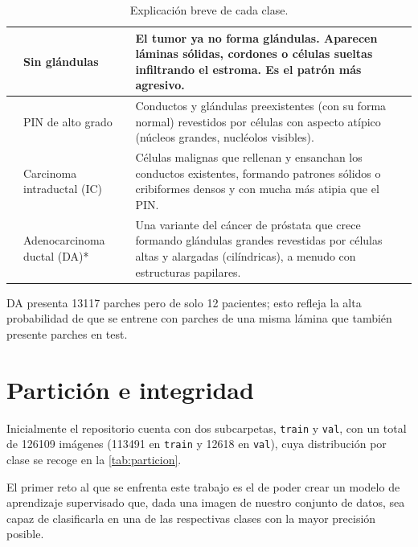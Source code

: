 \begin{table}[htbp]
\begin{tabularx}{\textwidth}{>{\raggedright\arraybackslash}p{2.6cm} >{\raggedright\arraybackslash}p{3.4cm} >{\raggedright\arraybackslash}X}
 & Sin glándulas & El tumor ya no forma glándulas. Aparecen láminas sólidas, cordones o células sueltas infiltrando el estroma. Es el patrón más agresivo. \\
\midrule
\multirow{3}{=}{Lesiones que no se gradúan con Gleason}
 & PIN de alto grado & Conductos y glándulas preexistentes (con su forma normal) revestidos por células con aspecto atípico (núcleos grandes, nucléolos visibles). \\
 & Carcinoma intraductal (IC) & Células malignas que rellenan y ensanchan los conductos existentes, formando patrones sólidos o cribiformes densos y con mucha más atipia que el PIN. \\
 & Adenocarcinoma ductal (DA)* & Una variante del cáncer de próstata que crece formando glándulas grandes revestidas por células altas y alargadas (cilíndricas), a menudo con estructuras papilares. \\
\bottomrule
\end{tabularx}
\caption{Explicación breve de cada clase.}
\label{tab:clases}
\vspace{2pt}
\begin{minipage}{\textwidth}
\footnotesize * DA presenta 13117 parches pero de solo 12 pacientes; esto refleja la alta probabilidad de que se entrene con parches de una misma lámina que también presente parches en test.
\end{minipage}
\end{table}


\section{Partición e integridad}\label{sec:particion}

Inicialmente el repositorio cuenta con dos subcarpetas, \texttt{train} y \texttt{val}, con un total de \num{126109} imágenes (\num{113491} en \texttt{train} y \num{12618} en \texttt{val}), cuya distribución por clase se recoge en la \cref{tab:particion}.



El primer reto al que se enfrenta este trabajo es el de poder crear un modelo de aprendizaje supervisado que, dada una imagen de nuestro conjunto de datos, sea capaz de clasificarla en una de las respectivas clases con la mayor precisión posible.

